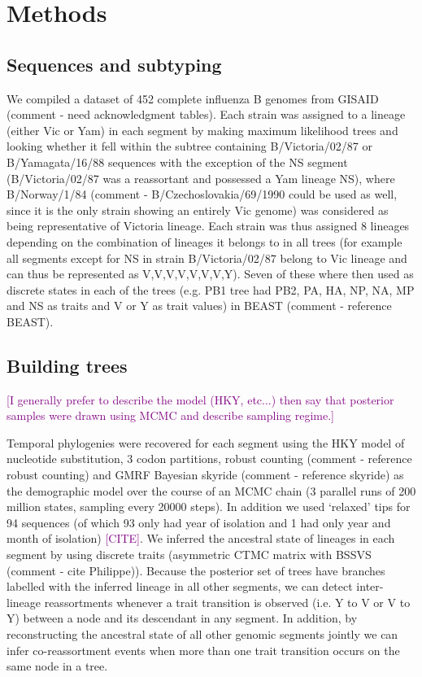 \documentclass[11pt,oneside,letterpaper]{article}
\def\tbc#1{\textcolor{purple}{[#1]}}
\begin{document}
\section*{Methods}

\subsection*{Sequences and subtyping}
We compiled a dataset of 452 complete influenza B genomes from GISAID (comment - need acknowledgment tables). 
Each strain was assigned to a lineage (either Vic or Yam) in each segment by making maximum likelihood trees and looking whether it fell within the subtree containing B/Victoria/02/87 or B/Yamagata/16/88 sequences with the exception of the NS segment (B/Victoria/02/87 was a reassortant and possessed a Yam lineage NS), where B/Norway/1/84 (comment - B/Czechoslovakia/69/1990 could be used as well, since it is the only strain showing an entirely Vic genome) was considered as being representative of Victoria lineage.
Each strain was thus assigned 8 lineages depending on the combination of lineages it belongs to in all trees (for example all segments except for NS in strain B/Victoria/02/87 belong to Vic lineage and can thus be represented as V,V,V,V,V,V,V,Y). 
Seven of these where then used as discrete states in each of the trees (e.g. PB1 tree had PB2, PA, HA, NP, NA, MP and NS as traits and V or Y as trait values) in BEAST (comment - reference BEAST).

\subsection*{Building trees}
\tbc{I generally prefer to describe the model (HKY, etc...) then say that posterior samples were drawn using MCMC and describe sampling regime.}

Temporal phylogenies were recovered for each segment using the HKY model of nucleotide substitution, 3 codon partitions, robust counting (comment - reference robust counting) and GMRF Bayesian skyride (comment - reference skyride) as the demographic model over the course of an MCMC chain (3 parallel runs of 200 million states, sampling every 20000 steps).
In addition we used `relaxed' tips for 94 sequences (of which 93 only had year of isolation and 1 had only year and month of isolation) \tbc{CITE}.
We inferred the ancestral state of lineages in each segment by using discrete traits (asymmetric CTMC matrix with BSSVS (comment - cite Philippe)). Because the posterior set of trees have branches labelled with the inferred lineage in all other segments, we can detect inter-lineage reassortments whenever a trait transition is observed (i.e. Y to V or V to Y) between a node and its descendant in any segment. 
In addition, by reconstructing the ancestral state of all other genomic segments jointly we can infer co-reassortment events when more than one trait transition occurs on the same node in a tree.
\end{document}
